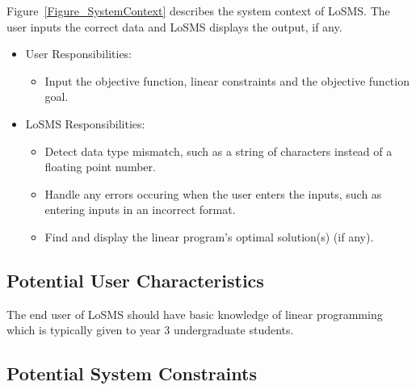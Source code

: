\documentclass[12pt]{article}
\newcommand{\famname}{LoSMS} %
\begin{document}
Figure~\ref{Figure_SystemContext} describes the system context of \famname{}. 
The user inputs the correct data and \famname{} displays the output, if any.

\begin{itemize}
	\item User Responsibilities: 
	\begin{itemize}
		\item Input the objective function, linear constraints and the 
		objective function goal.
	\end{itemize}
	\item \famname{} Responsibilities:
	\begin{itemize}
		\item Detect data type mismatch, such as a string of characters instead 
		of a floating point number.
		
		\item Handle any errors occuring when the user enters the inputs, such 
		as entering inputs in an incorrect format.
		
		\item Find and display the linear program's optimal solution(s) (if 
		any).
	\end{itemize}
\end{itemize}


\subsection{Potential User Characteristics} \label{SecUserCharacteristics}

The end user of \famname{} should have basic knowledge of linear programming  
which is typically given to year 3 undergraduate students.  

\subsection{Potential System Constraints}
\end{document}

